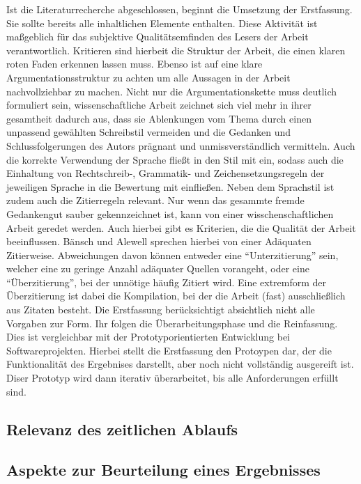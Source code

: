Ist die Literaturrecherche abgeschlossen, beginnt die Umsetzung der Erstfassung. Sie sollte bereits alle inhaltlichen Elemente enthalten. Diese Aktivität ist maßgeblich für das subjektive Qualitätsemfinden des Lesers der Arbeit verantwortlich. Kritieren sind hierbeit die Struktur der Arbeit, die einen klaren roten Faden erkennen lassen muss. Ebenso ist auf eine klare Argumentationsstruktur zu achten um alle Aussagen in der Arbeit nachvollziehbar zu machen.\cite[Vgl.][S. 59]{Baensch:2013}
Nicht nur die Argumentationskette muss deutlich formuliert sein, wissenschaftliche Arbeit zeichnet sich viel mehr in ihrer gesamtheit dadurch aus, dass sie Ablenkungen vom Thema durch einen unpassend gewählten Schreibstil vermeiden und die Gedanken und Schlussfolgerungen des Autors prägnant und unmissverständlich vermitteln. Auch die korrekte Verwendung der Sprache fließt in den Stil mit ein, sodass auch die Einhaltung von Rechtschreib-, Grammatik- und Zeichensetzungsregeln der jeweiligen Sprache in die Bewertung mit einfließen.\cite[Vgl.][S. 25-27]{Baensch:2013} 
Neben dem Sprachstil ist zudem auch die Zitierregeln relevant. Nur wenn das gesammte fremde Gedankengut sauber gekennzeichnet ist, kann von einer wisschenschaftlichen Arbeit geredet werden. Auch hierbei gibt es Kriterien, die die Qualität der Arbeit beeinflussen. Bänsch und Alewell sprechen hierbei von einer Adäquaten Zitierweise. Abweichungen davon können entweder eine \enquote{Unterzitierung} sein, welcher eine zu geringe Anzahl adäquater Quellen vorangeht, oder eine \enquote{Überzitierung}, bei der unnötige häufig Zitiert wird. Eine extremform der Überzitierung ist dabei die Kompilation, bei der die Arbeit (fast) ausschließlich aus Zitaten besteht.\cite[Vgl.][S.11 f.]{Baensch:2013}
Die Erstfassung berücksichtigt absichtlich nicht alle Vorgaben zur Form. Ihr folgen die Überarbeitungsphase und die Reinfassung. Dies ist vergleichbar mit der Prototyporientierten Entwicklung bei Softwareprojekten. Hierbei stellt die Erstfassung den Protoypen dar, der die Funktionalität des Ergebnises darstellt, aber noch nicht vollständig ausgereift ist. Diser Prototyp wird dann iterativ überarbeitet, bis alle Anforderungen erfüllt sind.\cite[Vgl.][S. 363]{Liggesmeyer:2009}
\subsection{Relevanz des zeitlichen Ablaufs}

\subsection{Aspekte zur Beurteilung eines Ergebnisses}

